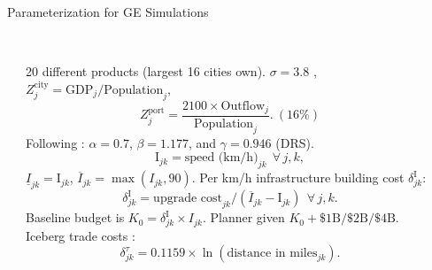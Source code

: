 \documentclass[aspectratio=169,xcolor=dvipsnames]{beamer}
\begin{document}
\begin{frame}{Parameterization for GE Simulations} 
\begin{adjustbox}{center}
    \begin{columns} \setlength{\columnsep}{0.5mm} %
                \begin{column}{0.015\textwidth}
                \end{column}
        \begin{column}{0.33\textwidth} \scriptsize 
\setlength{\abovedisplayskip}{6pt} %
\setlength{\belowdisplayskip}{6pt} %
\setlength{\parindent}{0pt} %
\hphantom{.}\\ \vspace{-3mm}
20 different products (largest 16 cities own). $\sigma = 3.8$ \citep{bajzik2020estimating}, $Z_j^\text{city} = \text{GDP}_j/\text{Population}_j$, 
$$Z_j^{\text{port}} = \frac{2100 \times \text{Outflow}_j}{\text{Population}_j}.\ (\text{16\%})$$
Following \citet{graff2024spatial}: $\alpha=0.7$, $\beta = 1.177$, and $\gamma = 0.946$ (DRS).
$$ \text{I}_{jk} = \text{speed (km/h)}_{jk} \ \ \forall\, j,k,$$
$\underline{I}_{jk} = \text{I}_{jk}$, $\overline{I}_{jk} = \max(I_{jk}, 90)$. Per km/h infrastructure building cost $\delta^\text{I}_{jk}$:
$$\delta^\text{I}_{jk} = \text{upgrade cost}_{jk} / (\overline{I}_{jk} - \text{I}_{jk}) \ \ \forall\, j,k.$$
Baseline budget is $K_0 = \delta^\text{I}_{jk}\times I_{jk}$. Planner given $K_0+\$1\text{B}/\$2\text{B}/\$4\text{B}$. 
Iceberg trade costs \citep{graff2024spatial}: 
 $$\delta^\tau_{jk} = 0.1159 \times \ln(\text{distance in miles}_{jk}).$$
        \end{column}
        \begin{column}{0.8\textwidth}
\end{column}
\end{columns}
\end{adjustbox}
\end{frame}
\end{document}
